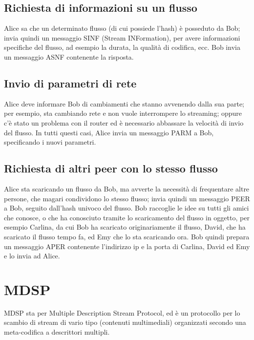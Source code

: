 \subsection{Richiesta di informazioni su un flusso}
%

Alice sa che un determinato flusso (di cui possiede l'hash) è posseduto da Bob; invia quindi un messaggio SINF (Stream INFormation), per avere informazioni specifiche del flusso, ad esempio la durata, la qualità di codifica, ecc. Bob invia un messaggio ASNF contenente la risposta.






\subsection{Invio di parametri di rete}
%

Alice deve informare Bob di cambiamenti che stanno avvenendo dalla sua parte; per esempio, sta cambiando rete e non vuole interrompere lo streaming; oppure c'è stato un problema con il router ed è necessario abbassare la velocità di invio del flusso. In tutti questi casi, Alice invia un messaggio PARM a Bob, specificando i nuovi parametri.






\subsection{Richiesta di altri peer con lo stesso flusso}
%

Alice sta scaricando un flusso da Bob, ma avverte la necessità di frequentare altre persone, che magari condividono lo stesso flusso; invia quindi un messaggio PEER a Bob, seguito dall'hash univoco del flusso. Bob raccoglie le idee su tutti gli amici che conosce, o che ha conosciuto tramite lo scaricamento del flusso in oggetto, per esempio Carlina, da cui Bob ha scaricato originariamente il flusso, David, che ha scaricato il flusso tempo fa, ed Emy che lo sta scaricando ora. Bob quindi prepara un messaggio APER contenente l'indirizzo ip e la porta di Carlina, David ed Emy e lo invia ad Alice.






\section{MDSP}


MDSP sta per Multiple Description Stream Protocol, ed è un protocollo per lo scambio di stream di vario tipo (contenuti multimediali) organizzati secondo una meta-codifica a descrittori multipli.





